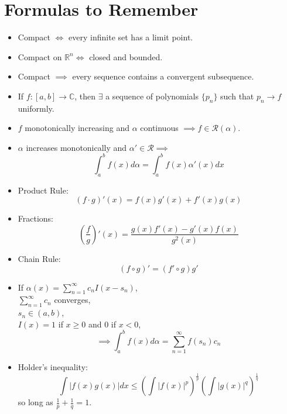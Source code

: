 \documentclass[11pt]{article}
\newcommand{\reals}{\mathbb{R}}
\newcommand{\intab}{\int_a^b}
\begin{document}
\section{Formulas to Remember}

\begin{itemize}
  \item Compact $\iff$ every infinite set has a limit point.

  \item Compact on $\reals^n \iff$ closed and bounded.

  \item Compact $\implies$ every sequence contains a convergent subsequence.

  \item If $f : [a, b] \rightarrow \mathbb C$, then $\exists$ a sequence of
    polynomials $\{p_n\}$ such that $p_n \rightarrow f$ uniformly.

  \item
    $f$ monotonically increasing and $\alpha$ continuous $\implies f \in
    \mathscr R(\alpha)$.

  \item
    $\alpha$ increases monotonically and $\alpha' \in \mathscr R \implies$
    $$\intab f(x) d\alpha = \intab f(x) \alpha'(x) dx$$

  \item Product Rule:
    $$(f \cdot g)'(x) = f(x) g'(x) + f'(x) g(x)$$

  \item Fractions:
    $$\left(\frac f g \right)'(x) = \frac{g(x) f'(x) - g'(x)f(x)}{g^2(x)}$$

  \item Chain Rule:
    $$(f \circ g)' = (f' \circ g) g'$$

  \item
    If $\alpha(x) = \sum_{n=1}^\infty c_n I(x - s_n)$, \\
    $\sum_{n=1}^\infty c_n$ converges, \\
    $s_n \in (a, b)$, \\
    $I(x) = 1$ if $x \geq 0$ and $0$ if $x < 0$, \\
    $$\implies \intab f(x) d\alpha = \sum_{n=1}^\infty f(s_n) c_n$$


  \item Holder's inequality:
    $$\int \left| f(x) g(x) \right| dx \leq \left(\int |f(x)|^p\right)^{\frac 1
    p} \left( \int |g(x)|^q\right)^{\frac 1 q}$$
    so long as $\frac 1 p + \frac 1 q = 1$.

\end{itemize}
\end{document}
